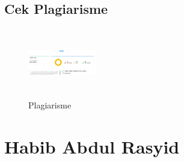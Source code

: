 \subsection{Cek Plagiarisme}
\begin{figure}[!htbp]
\centering
\includegraphics[width=3cm,height=3cm]{figures/4/1174005/plagiat.PNG}
\caption{Plagiarisme}
\label{plagiarisme}\end{figure}

\section{Habib Abdul Rasyid}
